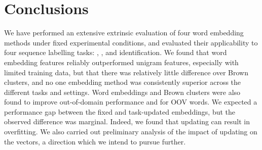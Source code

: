 \section{Conclusions}

We have performed an extensive extrinsic evaluation of four word embedding methods
under fixed experimental conditions, and evaluated their applicability to four sequence labelling tasks: \pos, \chunking, \ner and \mwe identification.
We found that word embedding features reliably outperformed unigram
features, especially with limited training data, but that there was
relatively little difference over Brown clusters, and
no one embedding method was consistently superior across the different tasks and settings.
Word embeddings and Brown clusters were also found to improve
out-of-domain performance and for OOV words.
We expected a performance gap between the fixed and task-updated embeddings, but the observed difference was marginal.
Indeed, we found that updating can result in overfitting.
We also carried out preliminary analysis of the impact of updating on
the vectors, a direction which we intend to pursue further.



